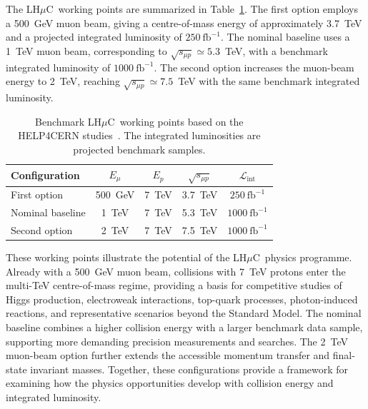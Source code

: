 \documentclass[a4paper,11pt]{article}
\newcommand{\lhmuc}{LH$\mu$C}
\begin{document}
The \lhmuc\ working points are summarized in Table~\ref{tab:benchmarks}. 
The first option employs a 500~GeV muon beam, 
giving a centre-of-mass energy of approximately 3.7~TeV and a projected
integrated luminosity of $250~\mathrm{fb}^{-1}$. The nominal baseline
uses a 1~TeV muon beam, corresponding to $\sqrt{s_{\mu p}}\simeq5.3$~TeV,
with a benchmark integrated luminosity of $1000~\mathrm{fb}^{-1}$. 
The second option increases the muon-beam energy to 2~TeV, reaching
$\sqrt{s_{\mu p}}\simeq7.5$~TeV with the same benchmark integrated
luminosity. 

\begin{table}[htbp]
\centering
\small
\setlength{\tabcolsep}{6pt}
\renewcommand{\arraystretch}{1.18}
\begin{tabular}{lcccc}
\toprule
Configuration
& $E_\mu$
& $E_p$
& $\sqrt{s_{\mu p}}$
& $\mathcal{L}_{\mathrm{int}}$\\
\midrule
First option
& 500~GeV & 7~TeV & 3.7~TeV
& $250~\mathrm{fb}^{-1}$\\
		
Nominal baseline
& 1~TeV & 7~TeV & 5.3~TeV
& $1000~\mathrm{fb}^{-1}$\\
		
Second option
& 2~TeV & 7~TeV & 7.5~TeV
& $1000~\mathrm{fb}^{-1}$\\
\bottomrule
\end{tabular}
\caption{Benchmark \lhmuc\ working points based on the HELP4CERN
studies~\cite{HELP4CERN}. The integrated luminosities are projected
benchmark samples.} 
\label{tab:benchmarks}
\end{table}

These working points illustrate the potential of the \lhmuc\ physics
programme. Already with a 500~GeV muon beam, collisions with 7~TeV
protons enter the multi-TeV centre-of-mass regime, providing a basis
for competitive studies of Higgs production, electroweak interactions,
top-quark processes, photon-induced reactions, and representative
scenarios beyond the Standard Model. The nominal baseline combines
a higher collision energy with a larger benchmark data sample,
supporting more demanding precision measurements and searches.
The 2~TeV muon-beam option further extends the accessible momentum
transfer and final-state invariant masses. Together, these
configurations provide a framework for examining how the physics
opportunities develop with collision energy and integrated luminosity.
\end{document}
